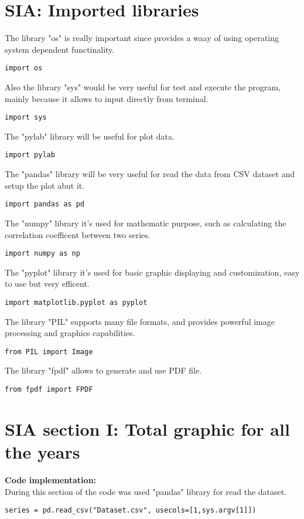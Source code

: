 \label{SIA_Implementation}

\section{SIA: Imported libraries}
\label{SIA_libraries}
The library "os" is really important since provides a waay of using operating system dependent functinality.
\begin{lstlisting}
import os
\end{lstlisting}

Also the library "sys" would be very useful for test and execute the program, mainly because it allows to input directly from terminal.
\begin{lstlisting}
import sys
\end{lstlisting}

The "pylab" library will be useful for plot data.
\begin{lstlisting}
import pylab
\end{lstlisting}

The "pandas" library will be very useful for read the data from CSV dataset and setup the plot abut it.
\begin{lstlisting}
import pandas as pd
\end{lstlisting}

The "numpy" library it's used for mathematic purpose, such as calculating the correlation coefficent between two series.
\begin{lstlisting}
import numpy as np
\end{lstlisting}
 
The "pyplot" library it's used for basic graphic displaying and customization, easy to use but very efficent.
\begin{lstlisting}
import matplotlib.pyplot as pyplot
\end{lstlisting}

The library "PIL" supports many file formats, and provides powerful image processing and graphics capabilities.
\begin{lstlisting}
from PIL import Image
\end{lstlisting}

The library "fpdf" allows to generate and use PDF file.
\begin{lstlisting}
from fpdf import FPDF
\end{lstlisting}

\section{SIA section I: Total graphic for all the years}
\label{SIA_section_I}
\textbf{Code implementation:}\\
During this section of the code was used "pandas" library for read the dataset.
\begin{lstlisting}
series = pd.read_csv("Dataset.csv", usecols=[1,sys.argv[1]])
\end{lstlisting}

